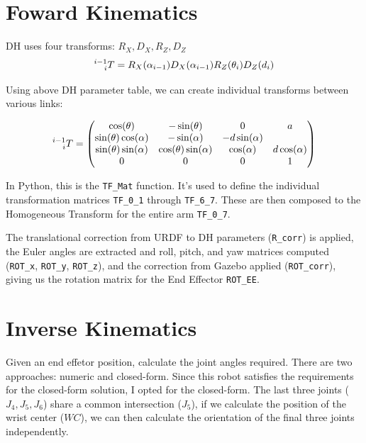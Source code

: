 \documentclass{article}
\begin{document}
\newpage



\section{Foward Kinematics}

DH uses four transforms: $R_X, D_X, R_Z, D_Z$
\begin{equation}
    \prescript{i-1}{i}T = R_X(\alpha_{i-1})D_X(\alpha_{i-1})R_Z(\theta_i)D_Z({d_i})
\end{equation}

Using above DH parameter table, we can create individual transforms
between various links:

\begin{equation}
    \prescript{i-1}{i}T = \begin{pmatrix}
        \cos(\theta) & -\sin(\theta) & 0 & a \\
        \sin(\theta)\cos(\alpha) & -\sin(\alpha) & -d\sin(\alpha) \\
        \sin(\theta)\sin(\alpha) & \cos(\theta)\sin(\alpha) &
        \cos(\alpha) & d\cos(\alpha) \\
        0 & 0 & 0 & 1
    \end{pmatrix}
\end{equation}

In Python, this is the \texttt{TF\_Mat} function. It’s used to define
the individual transformation matrices \texttt{TF\_0\_1} through
\texttt{TF\_6\_7}. These are then composed to the Homogeneous Transform
for the entire arm \texttt{TF\_0\_7}.

The translational correction from URDF to DH parameters
(\texttt{R\_corr}) is applied, the Euler angles are extracted and
roll, pitch, and yaw matrices computed (\texttt{ROT\_x},
\texttt{ROT\_y}, \texttt{ROT\_z}), and the correction from Gazebo
applied (\texttt{ROT\_corr}), giving us the rotation matrix for the
End Effector \texttt{ROT\_EE}.

\section{Inverse Kinematics}

Given an end effetor position, calculate the joint angles required.
There are two approaches: numeric and closed-form. Since this robot
satisfies the requirements for the closed-form solution, I opted for
the closed-form. The last three joints ($J_4, J_5, J_6$) share
a common intersection ($J_5$), if we calculate the position of the
wrist center (${WC}$), we can then calculate the orientation of the
final three joints independently.
\end{document}
